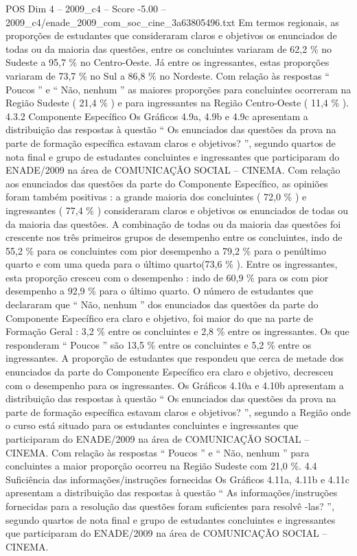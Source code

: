 \begin{textsample}{POS Dim 4 – 2009\_c4 – Score -5.00 – 2009\_c4/enade\_2009\_com\_soc\_cine\_3a63805496.txt}
Em termos regionais, as proporções de estudantes que consideraram claros e objetivos os enunciados de todas ou da maioria das questões, entre os concluintes variaram de 62,2 \% no Sudeste a 95,7 \% no Centro-Oeste.
Já entre os ingressantes, estas proporções variaram de 73,7 \% no Sul a 86,8 \% no Nordeste.
Com relação às respostas “ Poucos ” e “ Não, nenhum ” as maiores proporções para concluintes ocorreram na Região Sudeste ( 21,4 \% ) e para ingressantes na Região Centro-Oeste ( 11,4 \% ). 4.3.2 Componente Específico Os Gráficos 4.9a, 4.9b e 4.9c apresentam a distribuição das respostas à questão “ Os enunciados das questões da prova na parte de formação específica estavam claros e objetivos? ”, segundo quartos de nota final e grupo de estudantes concluintes e ingressantes que participaram do ENADE/2009 na área de COMUNICAÇÃO SOCIAL – CINEMA.
Com relação aos enunciados das questões da parte do Componente Específico, as opiniões foram também positivas : a grande maioria dos concluintes ( 72,0 \% ) e ingressantes ( 77,4 \% ) consideraram claros e objetivos os enunciados de todas ou da maioria das questões.
A combinação de todas ou da maioria das questões foi crescente nos três primeiros grupos de desempenho entre os concluintes, indo de 55,2 \% para os concluintes com pior desempenho a 79,2 \% para o penúltimo quarto e com uma queda para o último quarto(73,6 \% ).
Entre os ingressantes, esta proporção cresceu com o desempenho : indo de 60,9 \% para os com pior desempenho a 92,9 \% para o último quarto.
O número de estudantes que declararam que “ Não, nenhum ” dos enunciados das questões da parte do Componente Específico era claro e objetivo, foi maior do que na parte de Formação Geral : 3,2 \% entre os concluintes e 2,8 \% entre os ingressantes.
Os que responderam “ Poucos ” são 13,5 \% entre os concluintes e 5,2 \% entre os ingressantes.
A proporção de estudantes que respondeu que cerca de metade dos enunciados da parte do Componente Específico era claro e objetivo, decresceu com o desempenho para os ingressantes.
Os Gráficos 4.10a e 4.10b apresentam a distribuição das respostas à questão “ Os enunciados das questões da prova na parte de formação específica estavam claros e objetivos? ”, segundo a Região onde o curso está situado para os estudantes concluintes e ingressantes que participaram do ENADE/2009 na área de COMUNICAÇÃO SOCIAL – CINEMA.
Com relação às respostas “ Poucos ” e “ Não, nenhum ” para concluintes a maior proporção ocorreu na Região Sudeste com 21,0 \%. 4.4 Suficiência das informações/instruções fornecidas Os Gráficos 4.11a, 4.11b e 4.11c apresentam a distribuição das respostas à questão “ As informações/instruções fornecidas para a resolução das questões foram suficientes para resolvê -las? ”, segundo quartos de nota final e grupo de estudantes concluintes e ingressantes que participaram do ENADE/2009 na área de COMUNICAÇÃO SOCIAL – CINEMA.

\end{textsample}

